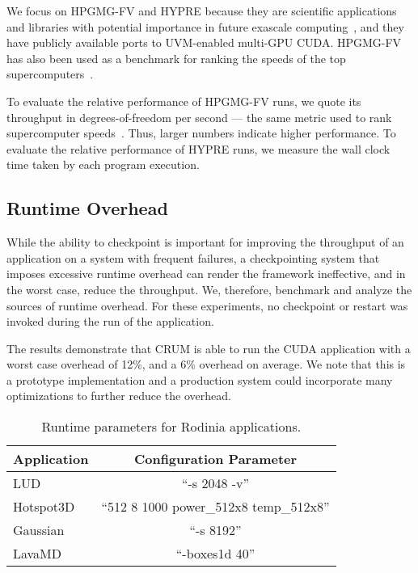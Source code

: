 \documentclass[11pt]{article}
\begin{document}
We focus on HPGMG-FV and HYPRE because they are scientific applications and
libraries with potential importance in future exascale
computing~\cite{kothe_douglas_exascale_2016}, and
they have publicly available ports to UVM-enabled multi-GPU CUDA. HPGMG-FV has
also been used as a benchmark for ranking the speeds of the top
supercomputers~\cite{hpgmg_benchmarking}.

To evaluate the relative performance of HPGMG-FV runs, we quote its throughput
in
degrees-of-freedom per second --- the same metric used to rank supercomputer
speeds~\cite{hpgmg_benchmarking}.  Thus, larger numbers indicate higher
performance.
To evaluate the relative performance of HYPRE
runs, we measure the wall clock time taken by each program execution.


\subsection{Runtime Overhead}

While the ability to checkpoint is important for improving the
throughput of an application on a system with frequent failures, a
checkpointing system that imposes excessive runtime overhead can render the
framework ineffective, and in the worst case, reduce the throughput.
We, therefore, benchmark and
analyze the sources of runtime overhead.  For these experiments, no
checkpoint or restart was invoked during the run of the application.

The results demonstrate that CRUM is able to run the CUDA application with a
worst case overhead of 12\%, and a 6\% overhead on average. We note that this
is
a prototype implementation and a production system could incorporate many
optimizations to further reduce the overhead.

\begin{table}[ht]
\caption{\label{tbl:rodiniaConfig} Runtime parameters for Rodinia applications.}
\centering
  \begin{tabular}{|l|c|}
  \hline
  Application & Configuration Parameter \\
  \hline
    LUD       & ``-s 2048 -v'' \\
  \hline
    Hotspot3D & ``512 8 1000 power\_512x8 temp\_512x8'' \\
  \hline
    Gaussian  & ``-s 8192'' \\
  \hline
    LavaMD    & ``-boxes1d 40'' \\
  \hline
\end{tabular}
\end{table}
\end{document}
